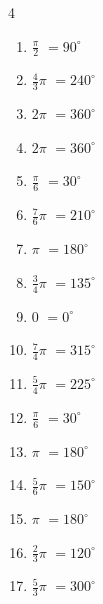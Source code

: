 \begin{multicols}{4}
\begin{enumerate}
  \item $\displaystyle \frac{\pi}{2}$
        $\displaystyle =90^{\circ}$

  \item $\displaystyle \frac{4}{3}\pi$
        $\displaystyle =240^{\circ}$

  \item $\displaystyle 2\pi$
        $\displaystyle =360^{\circ}$

  \item $\displaystyle 2\pi$
        $\displaystyle =360^{\circ}$

  \item $\displaystyle \frac{\pi}{6}$
        $\displaystyle =30^{\circ}$

  \item $\displaystyle \frac{7}{6}\pi$
        $\displaystyle =210^{\circ}$

  \item $\displaystyle \pi$
        $\displaystyle =180^{\circ}$

  \item $\displaystyle \frac{3}{4}\pi$
        $\displaystyle =135^{\circ}$

  \item $\displaystyle 0$
        $\displaystyle =0^{\circ}$

  \item $\displaystyle \frac{7}{4}\pi$
        $\displaystyle =315^{\circ}$

  \item $\displaystyle \frac{5}{4}\pi$
        $\displaystyle =225^{\circ}$

\columnbreak %

  \item $\displaystyle \frac{\pi}{6}$
        $\displaystyle =30^{\circ}$

  \item $\displaystyle \pi$
        $\displaystyle =180^{\circ}$

  \item $\displaystyle \frac{5}{6}\pi$
        $\displaystyle =150^{\circ}$

  \item $\displaystyle \pi$
        $\displaystyle =180^{\circ}$

  \item $\displaystyle \frac{2}{3}\pi$
        $\displaystyle =120^{\circ}$

  \item $\displaystyle \frac{5}{3}\pi$
        $\displaystyle =300^{\circ}$


\end{enumerate}
\end{multicols}

